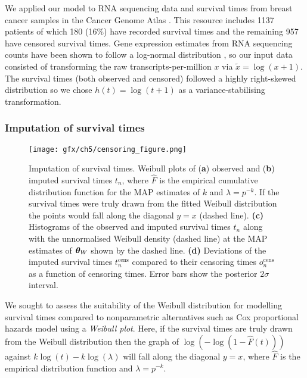 We applied our model to RNA sequencing data and survival times from breast cancer samples in the Cancer Genome Atlas \citep{Weinstein2013-ww,Tatlow2016-yo}. This resource includes 1137 patients of which 180 (16\%) have recorded survival times and the remaining 957 have censored survival times. Gene expression estimates from RNA sequencing counts have been shown to follow a log-normal distribution \citep{Law2014-tu,Pimentel2016-xz}, so our input data consisted of transforming the raw transcripts-per-million $x$ via $\tilde{x} = \log(x + 1)$. The survival times (both observed and censored) followed a highly right-skewed distribution so we chose $h(t) = \log(t + 1)$ as a variance-stabilising transformation.

\subsubsection{Imputation of survival times}

\begin{figure}
  \centering
\texttt{[image: gfx/ch5/censoring\_figure.png]}
\caption{Imputation of survival times. Weibull plots of (\textbf{a}) observed  and (\textbf{b}) imputed  survival times $t_n$, where $\hat{F}$ is the empirical cumulative distribution function for the MAP estimates of $k$ and $\lambda = p^{-k}$. If the survival times were truly drawn from the fitted Weibull distribution the points would fall along the diagonal $y=x$ (dashed line).
\textbf{(c)} Histograms of the observed and imputed survival times $t_n$ along with the unnormalised Weibull density (dashed line) at the MAP estimates of $\bm{\theta}_W$ shown by the dashed line.
\textbf{(d)} Deviations of the imputed survival times $t^{\text{cens}}_n$ compared to their censoring times $o^{\text{cens}}_n$ as a function of censoring times. Error bars show the posterior $2 \sigma$ interval.
} \label{fig:censoring_figure}
\end{figure}

We sought to assess the suitability of the Weibull distribution for modelling survival times compared to nonparametric alternatives such as Cox proportional hazards model using a \emph{Weibull plot}. Here, if the survival times are truly drawn from the Weibull distribution then the graph of $\log(-\log(1 - \hat{F}(t)))$ against $k \log(t) - k \log(\lambda)$ will fall along the diagonal $y=x$, where $\hat{F}$ is the empirical distribution function and $\lambda = p^{-k}$.

